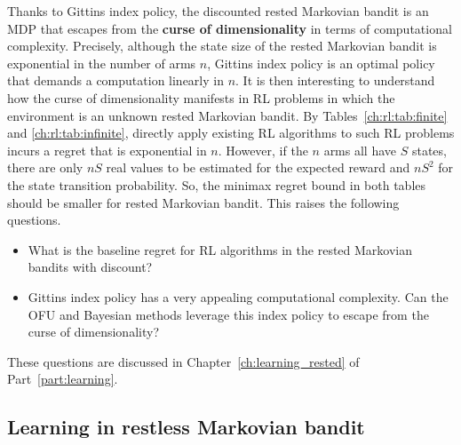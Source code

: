 Thanks to Gittins index policy, the discounted rested Markovian bandit is an MDP that escapes from the \textbf{curse of dimensionality} in terms of computational complexity.
Precisely, although the state size of the rested Markovian bandit is exponential in the number of arms $n$, Gittins index policy is an optimal policy that demands a computation linearly in $n$.
It is then interesting to understand how the curse of dimensionality manifests in RL problems in which the environment is an unknown rested Markovian bandit.
By Tables~\ref{ch:rl:tab:finite} and \ref{ch:rl:tab:infinite}, directly apply existing RL algorithms to such RL problems incurs a regret that is exponential in $n$.
However, if the $n$ arms all have $S$ states, there are only $nS$ real values to be estimated for the expected reward and $nS^2$ for the state transition probability.
So, the minimax regret bound in both tables should be smaller for rested Markovian bandit.
This raises the following questions.
\begin{itemize}
    \item What is the baseline regret for RL algorithms in the rested Markovian bandits with discount?
    \item Gittins index policy has a very appealing computational complexity. Can the OFU and Bayesian methods leverage this index policy to escape from the curse of dimensionality?
\end{itemize}
These questions are discussed in Chapter~\ref{ch:learning_rested} of Part~\ref{part:learning}.

\subsection{Learning in restless Markovian bandit}

